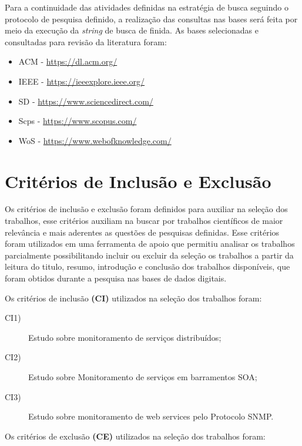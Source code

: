 Para a continuidade das atividades definidas na estratégia de busca seguindo o protocolo de pesquisa definido, a realização das consultas nas bases será feita por meio da execução da \textit{string} de busca de finida. As bases selecionadas  e consultadas para revisão da literatura foram:
\begin{itemize}
\item \acrlong{ACM} - \url{https://dl.acm.org/}
\item \acrlong{IEEE} - \url{https://ieeexplore.ieee.org/}
\item \acrlong{SD} - \url{https://www.sciencedirect.com/}
\item \acrlong{Scps} - \url{https://www.scopus.com/}
\item \acrlong{WoS} - \url{https://www.webofknowledge.com/}
\end{itemize}


\section{Critérios de Inclusão e Exclusão}
\label{sec:cIncExc}
Os critérios de inclusão e exclusão foram definidos para auxiliar na seleção dos trabalhos, esse critérios auxiliam na buscar por trabalhos científicos de maior relevância e mais aderentes as questões de pesquisas definidas. Esse critérios foram utilizados em uma ferramenta de apoio que permitiu analisar os trabalhos parcialmente possibilitando incluir ou excluir da seleção os trabalhos a partir da leitura do titulo, resumo, introdução e conclusão dos trabalhos disponíveis, que foram obtidos durante a pesquisa nas bases de dados digitais.    

Os critérios de inclusão \textbf{(CI)} utilizados na seleção dos trabalhos foram:

\begin{description}

\item[CI1)] Estudo sobre monitoramento de serviços distribuídos;
\item[CI2)] Estudo sobre Monitoramento de serviços em barramentos SOA;
\item[CI3)] Estudo sobre monitoramento de web services pelo Protocolo SNMP.
\end{description}

Os critérios de exclusão \textbf{(CE)} utilizados na seleção dos trabalhos foram:

